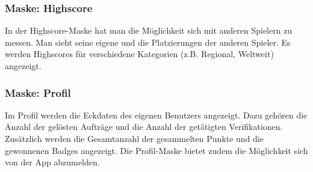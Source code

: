 \begin{figure}[H]
\hfill
{}
\end{figure}

\subsubsection{Maske: Highscore}
In der Highscore-Maske hat man die Möglichkeit sich mit anderen Spielern zu messen.
Man sieht seine eigene und die Platzierungen der anderen Spieler.
Es werden Highscores für verschiedene Kategorien (z.B. Regional, Weltweit) angezeigt.

\subsubsection{Maske: Profil}
Im Profil werden die Eckdaten des eigenen Benutzers angezeigt.
Dazu gehören die Anzahl der gelösten Aufträge und die Anzahl der getätigten Verifikationen.
Zusätzlich werden die Gesamtanzahl der gesammelten Punkte und die gewonnenen Badges angezeigt.
Die Profil-Maske bietet zudem die Möglichkeit sich von der App abzumelden.

